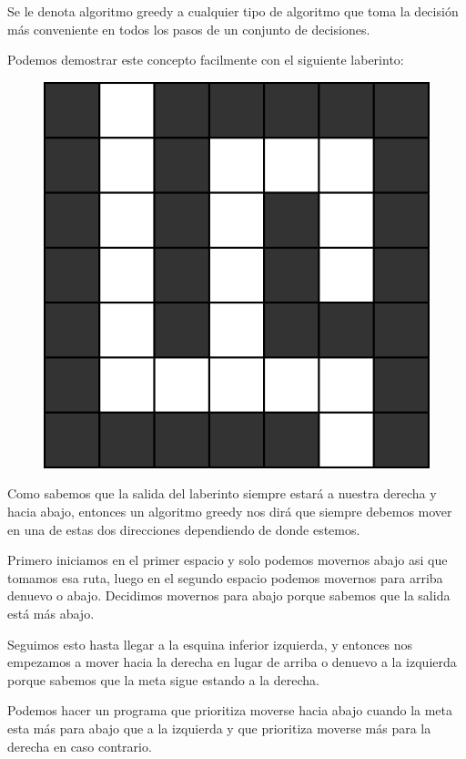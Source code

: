 \documentclass{article}
\begin{document}
Se le denota algoritmo greedy a cualquier tipo de algoritmo que toma la decisión más conveniente en todos los pasos de un conjunto de decisiones.

Podemos demostrar este concepto facilmente con el siguiente laberinto:

\begin{figure}[H]
    \centering
    \includegraphics[width=0.2\paperwidth]{greedy}
\end{figure}

Como sabemos que la salida del laberinto siempre estará a nuestra derecha y hacia abajo, entonces un algoritmo greedy nos dirá que siempre debemos mover en una de estas dos direcciones dependiendo de donde estemos.

Primero iniciamos en el primer espacio y solo podemos movernos abajo asi que tomamos esa ruta, luego en el segundo espacio podemos movernos para arriba denuevo o abajo. Decidimos movernos para abajo porque sabemos que la salida está más abajo.

Seguimos esto hasta llegar a la esquina inferior izquierda, y entonces nos empezamos a mover hacia la derecha en lugar de arriba o denuevo a la izquierda porque sabemos que la meta sigue estando a la derecha.

Podemos hacer un programa que prioritiza moverse hacia abajo cuando la meta esta más para abajo que a la izquierda y que prioritiza moverse más para la derecha en caso contrario.
\end{document}
